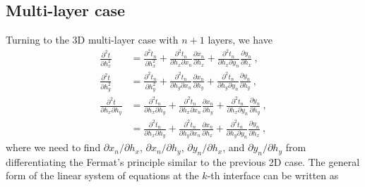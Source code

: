 \subsection{Multi-layer case}
Turning to the 3D multi-layer case with $n+1$ layers, we have
\begin{align}
\label{eq:time3d2der}
\frac{\partial^2 t}{\partial h_x^2} & =  \frac{\partial^2 t_n}{\partial h_x^2} +
    \frac{\partial^2 t_n}{\partial h_x\partial x_n} \frac{\partial x_n}{\partial h_x} +
    \frac{\partial^2 t_n}{\partial h_x\partial y_n} \frac{\partial y_n}{\partial h_x}~,\\ \nonumber
\frac{\partial^2 t}{\partial h_y^2} & =  \frac{\partial^2 t_n}{\partial h_y^2} +
    \frac{\partial^2 t_n}{\partial h_y\partial x_n} \frac{\partial x_n}{\partial h_y} +
    \frac{\partial^2 t_n}{\partial h_y\partial y_n} \frac{\partial y_n}{\partial h_y}~,\\ \nonumber
\frac{\partial^2 t}{\partial h_x \partial h_y} & =  \frac{\partial^2 t_n}{\partial h_x\partial h_y} +
    \frac{\partial^2 t_n}{\partial h_x \partial x_n} \frac{\partial x_n}{\partial h_y} +
    \frac{\partial^2 t_n}{\partial h_x \partial y_n} \frac{\partial y_n}{\partial h_y}~,\\ \nonumber
    & =  \frac{\partial^2 t_n}{\partial h_x\partial h_y} +
    \frac{\partial^2 t_n}{\partial h_y \partial x_n} \frac{\partial x_n}{\partial h_x} +
    \frac{\partial^2 t_n}{\partial h_y \partial y_n} \frac{\partial y_n}{\partial h_x}~,
\end{align}
where we need to find $\partial x_n/\partial h_x$, $\partial x_n/\partial h_y$, $\partial y_n/\partial h_x$, and $\partial y_n/\partial h_y$ from differentiating the Fermat's principle similar to the previous 2D case. The general form of the linear system of equations at the $k$-th interface can be written as
